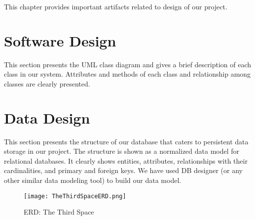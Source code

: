 This chapter provides important artifacts related to design of our project.

\section{Software Design}

This section presents the UML class diagram and gives a brief description of each class in our system. Attributes and methods of each class and relationship among classes are clearly presented.


\section{Data Design}

This section presents the structure of our database that caters to persistent data storage in our project. The structure is shown as a normalized data model for relational databases. It clearly shows entities, attributes, relationships with their cardinalities, and primary and foreign keys. We have used DB designer (or any other similar data modeling tool) to build our data model.
\begin{figure}
  \caption{ERD: The Third Space}
  \texttt{[image: TheThirdSpaceERD.png]}
  \centering
\end{figure}